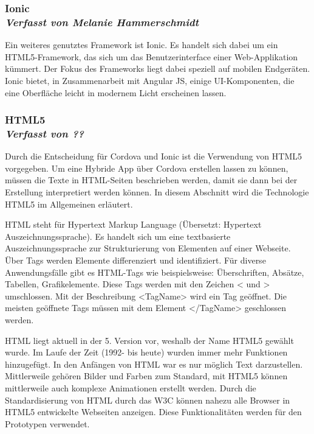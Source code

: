 \subsubsection[Ionic]{Ionic
 \\ \textnormal{\small{\textit {Verfasst von Melanie Hammerschmidt}}}}

Ein weiteres genutztes Framework ist Ionic. Es handelt sich dabei um ein HTML5-Framework, das sich um das Benutzerinterface einer Web-Applikation kümmert. Der Fokus des Frameworks liegt dabei speziell auf mobilen Endgeräten.
Ionic bietet, in Zusammenarbeit mit Angular JS, einige UI-Komponenten, die eine Oberfläche leicht in modernem Licht erscheinen lassen.

\subsubsection[HTML 5]{HTML5
 \\ \textnormal{\small{\textit {Verfasst von ??}}}}

Durch die Entscheidung für Cordova und Ionic ist die Verwendung von HTML5 vorgegeben. Um eine Hybride App über Cordova erstellen lassen zu können, müssen die Texte in HTML-Seiten beschrieben werden, damit sie dann bei der Erstellung interpretiert werden können. In diesem Abschnitt wird die Technologie HTML5 im Allgemeinen erläutert.

HTML steht für Hypertext Markup Language (Übersetzt: Hypertext Auszeichnungssprache). Es handelt sich um eine textbasierte Auszeichnungssprache zur Strukturierung von Elementen auf einer Webseite. 
Über Tags werden Elemente differenziert und identifiziert. Für diverse Anwendungsfälle gibt es HTML-Tags wie beispielsweise: Überschriften, Absätze, Tabellen, Grafikelemente.
Diese Tags werden mit den Zeichen < und > umschlossen. Mit der Beschreibung <TagName> wird ein Tag geöffnet.  Die meisten geöffnete Tags müssen mit dem Element </TagName> geschlossen werden. 

HTML liegt aktuell in der 5. Version vor, weshalb der Name HTML5 gewählt wurde. Im Laufe der Zeit (1992- bis heute) wurden immer mehr Funktionen hinzugefügt. In den Anfängen von HTML war es nur möglich Text darzustellen. Mittlerweile gehören Bilder und Farben zum Standard, mit HTML5 können mittlerweile auch komplexe Animationen erstellt werden. Durch die Standardisierung von HTML durch das W3C können nahezu alle Browser in HTML5 entwickelte Webseiten anzeigen. Diese Funktionalitäten werden für den Prototypen verwendet.



